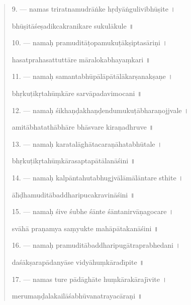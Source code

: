 \documentclass[a4paper, 11pt, oneside, french, landscape, twocolumn]{article}
\begin{document}
\begin{quotation}
9. --- namas triratnamudr\={a}\.{n}ke h\d{r}dy\={a}\.{n}gulivibh\={u}\d{s}ite \texthindi{।}

bh\={u}\d{s}it\={a}\'{s}e\d{s}adikcakranikare sukul\={a}kule \texthindi{॥}

\bigskip

10. --- nama\d{h} pramudit\={a}\d{t}opamuku\d{t}\={a}k\d{s}iptas\={a}ri\d{n}i \texthindi{।}

hasatprahasattutt\={a}re m\={a}ralokabhaya\d{m}kari \texthindi{॥}

\bigskip

11. --- nama\d{h} samantabh\={u}p\={a}l\={a}p\={a}t\={a}l\={a}kar\d{s}anak\d{s}a\d{n}e \texthindi{।}

bh\d{r}ku\d{t}ik\d{r}tah\={u}\d{m}k\={a}re sarv\={a}padavimocani \texthindi{॥}

\bigskip

12. --- nama\d{h} \'{s}ikha\d{n}\d{d}akha\d{n}\d{d}endumuku\d{t}\={a}bhara\d{n}ojjvale \texthindi{।}

amit\={a}bhatath\={a}bh\={a}re bh\={a}svare kira\d{n}adhruve \texthindi{॥}

\bigskip

13. --- nama\d{h} karatal\={a}gh\={a}tacara\d{n}\={a}hatabh\={u}tale \texthindi{।}

bh\d{r}ku\d{t}ik\d{r}tah\={u}\d{m}k\={a}rasaptap\={a}t\={a}lan\={a}\'{s}ini \texthindi{॥}

\bigskip

14. --- nama\d{h} kalp\={a}ntahutabhugjv\={a}l\={a}m\={a}l\={a}ntare sthite \texthindi{।}

\={a}l\={\i}\d{d}hamudit\={a}baddharipucakravin\={a}\'{s}ini \texthindi{॥}

\bigskip

15. --- nama\d{h} \'{s}ive \'{s}ubhe \'{s}\={a}nte \'{s}\={a}ntanirv\={a}\d{n}agocare \texthindi{।}

sv\={a}h\={a} pra\d{n}amya sa\d{m}yukte mah\={a}p\={a}takan\={a}\'{s}ini \texthindi{॥}

\bigskip

16. --- nama\d{h} pramudit\={a}baddharipug\={a}traprabhedani \texthindi{।}

da\'{s}\={a}k\d{s}arap\={a}dany\={a}se vidy\={a}hu\d{m}k\={a}rad\={\i}pite \texthindi{॥}

\bigskip

17. --- namas ture p\={a}d\={a}gh\={a}te hu\d{m}k\={a}rak\={a}raj\={\i}vite \texthindi{।}

meruma\d{n}\d{d}alakail\={a}\'{s}abh\={u}vanatrayac\={a}ra\d{n}i \texthindi{॥}


\end{quotation}
\end{document}
